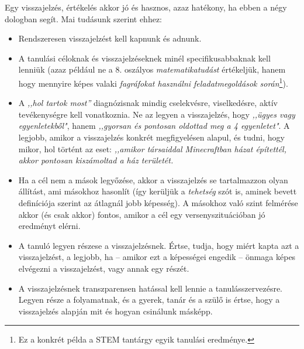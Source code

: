 Egy visszajelzés, értékelés akkor jó és hasznos, azaz hatékony, ha ebben a négy
dologban segít. Mai tudásunk szerint ehhez:
\begin{itemize}
      \item Rendszeresen visszajelzést kell kapnunk és adnunk.
      \item A tanulási céloknak és visszajelzéseknek minél specifikusabbaknak
            kell
            lenniük (azaz például ne a 8. oszályos \emph{matematikatudást}
            értékeljük,
            hanem hogy mennyire képes valaki \emph{fagráfokat
                  használni
                  feladatmegoldások során}\footnote{Ez a konkrét példa a STEM
                  tantárgy
                  egyik
                  tanulási eredménye.}).
      \item A \emph{,,hol tartok most''} diagnózisnak mindig cselekvésre,
            viselkedésre, aktív tevékenységre kell vonatkoznia. Ne az legyen a
            visszajelzés, hogy \emph{,,ügyes vagy egyenletekből"}, hanem
            \emph{,,gyorsan és
                  pontosan oldottad meg a 4 egyenletet"}. A legjobb, amikor a
            visszajelzés
            konkrét megfigyelésen alapul, és tudni, hogy mikor, hol történt az
            eset:
            \emph{,,amikor társaiddal Minecraftban házat építettél, akkor
                  pontosan
                  kiszámoltad a ház területét.}
      \item Ha a cél nem a mások legyőzése, akkor a visszajelzés se
            tartalmazzon
            olyan állítást, ami másokhoz hasonlít (így kerüljük a
            \emph{tehetség}
            szót is,
            aminek bevett definíciója szerint az átlagnál jobb képesség). A
            másokhoz való
            szint felmérése akkor (és csak akkor) fontos, amikor a cél egy
            versenyszituációban jó eredményt elérni.

      \item A tanuló legyen részese a visszajelzésnek. Értse, tudja, hogy miért
            kapta
            azt a visszajelzést, a legjobb, ha -- amikor ezt a képességei
            engedik
            -- önmaga
            képes elvégezni a visszajelzést, vagy annak egy részét.
      \item A visszajelzésnek transzparensen hatással kell lennie a
            tanulásszervezésre. Legyen része a folyamatnak, és a gyerek, tanár
            és a
            szülő
            is értse, hogy a visszajelzés alapján mit és hogyan csinálunk
            másképp.
\end{itemize}


